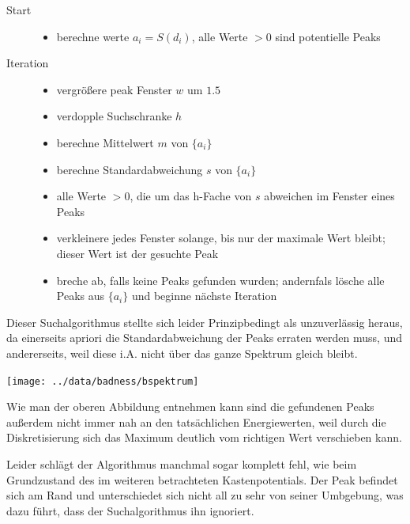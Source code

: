 \documentclass[10pt,a4paper,german]{scrartcl}
\begin{document}
    		\begin{description}
    			\item[Start]
		    		\begin{itemize}
				    	\item{berechne werte $a_i = S(d_i)$,
    					  alle Werte $>0$ sind potentielle Peaks}
		    		\end{itemize}
    			\item[Iteration]
		    		\begin{itemize}
				    	\item{vergrößere peak Fenster $w$ um $1.5$}
    					\item{verdopple Suchschranke $h$}
		    			\item{berechne Mittelwert $m$ von $\{a_i\}$}
				    	\item{berechne Standardabweichung $s$ von $\{a_i\}$}
    					\item{alle Werte $>0$, die um das h-Fache von $s$
		    			  abweichen im Fenster eines Peaks}
				    	\item{verkleinere jedes Fenster solange, 
    					  bis nur der maximale Wert bleibt;
		    			  dieser Wert ist der gesuchte Peak}
				    	\item{breche ab, falls keine Peaks gefunden wurden;
    					  andernfals lösche alle Peaks aus $\{a_i\}$ 
		    			  und beginne nächste Iteration}
				    \end{itemize}
    		\end{description}
    		
    		Dieser Suchalgorithmus stellte sich leider Prinzipbedingt als
    		unzuverlässig heraus, da einerseits apriori die Standardabweichung
    		der Peaks erraten werden muss, und andererseits, weil diese
    		i.A. nicht über das ganze Spektrum gleich bleibt.
    		
        \texttt{[image: ../data/badness/bspektrum]}
			
    		Wie man der oberen Abbildung entnehmen kann sind die gefundenen Peaks
    		außerdem nicht immer nah an den tatsächlichen Energiewerten, weil
		    durch die Diskretisierung sich das Maximum deutlich vom richtigen Wert
    		verschieben kann.

    		Leider schlägt der Algorithmus manchmal sogar komplett fehl, wie beim
    		Grundzustand des im weiteren betrachteten Kastenpotentials.
    		Der Peak befindet	sich am Rand und unterschiedet sich nicht all
    		zu sehr von seiner Umbgebung,	was dazu führt, dass der Suchalgorithmus
    		ihn ignoriert.
    		
\end{document}
